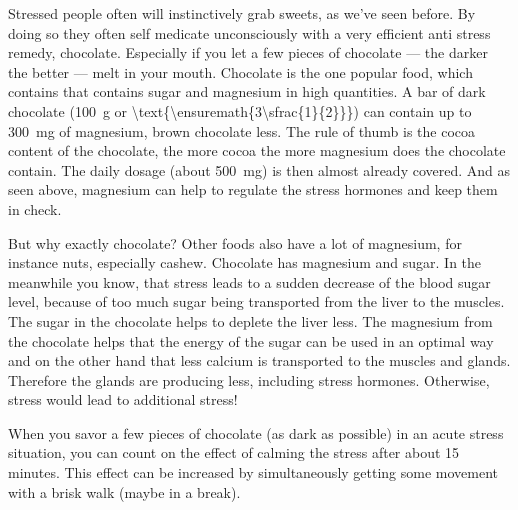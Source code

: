 \documentclass[../main.tex]{subfiles}
\begin{document}
Stressed people often will instinctively grab sweets, as we've seen before.
By doing so they often self medicate unconsciously with a very efficient anti stress remedy, chocolate.
Especially if you let a few pieces of chocolate --- the darker the better --- melt in your mouth.
Chocolate is the one popular food, which contains that contains sugar and magnesium in high quantities.
A bar of dark chocolate (\SI{100}{\gram} or \SI[parse-numbers=false]{\text{\ensuremath{3\sfrac{1}{2}}}}{\oz}) can contain up to
\SI{300}{\milli\gram} of magnesium, brown chocolate less.
The rule of thumb is the cocoa content of the chocolate, the more cocoa the more magnesium does the chocolate contain.
The daily dosage (about \SI{500}{\milli\gram}) is then almost already covered.
And as seen above, magnesium can help to regulate the stress hormones and keep them in check.

But why exactly chocolate?
Other foods also have a lot of magnesium, for instance nuts, especially cashew.
Chocolate has magnesium and sugar.
In the meanwhile you know, that stress leads to a sudden decrease of the blood sugar level, because of
too much sugar being transported from the liver to the muscles.
The sugar in the chocolate helps to deplete the liver less.
The magnesium from the chocolate helps that the energy of the sugar can be used in an optimal way
and on the other hand that less calcium is transported to the muscles and glands.
Therefore the glands are producing less, including stress hormones.
Otherwise, stress would lead to additional stress!

When you savor a few pieces of chocolate (as dark as possible) in an acute stress situation,
you can count on the effect of calming the stress after about 15 minutes.
This effect can be increased by simultaneously getting some movement with a brisk walk (maybe in a break).\cite{PortaStress}
\end{document}
